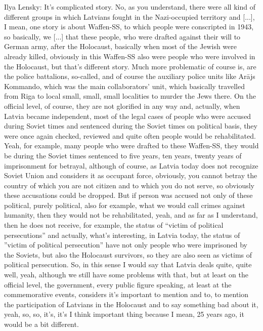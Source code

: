 Ilya Lensky: It’s complicated story. No, as you understand, there were all kind of different groups in which Latvians fought in the Nazi-occupied territory and [...], I mean, one story is about Waffen-SS, to which people were conscripted in 1943, so basically, we [...] that these people, who were drafted against their will to German army, after the Holocaust, basically when most of the Jewish were already killed, obviously in this Waffen-SS also were people who were involved in the Holocaust, but that’s different story. Much more problematic of course is, are the police battalions, so-called, and of course the auxiliary police units like Arājs Kommando, which was the main collaborators’ unit, which basically travelled from Riga to local small, small, small localities to murder the Jews there. On the official level, of course, they are not glorified in any way and, actually, when Latvia became independent, most of the legal cases of people who were accused during Soviet times and sentenced during the Soviet times on political basis, they were once again checked, reviewed and quite often people would be rehabilitated. Yeah, for example, many people who were drafted to these Waffen-SS, they would be during the Soviet times sentenced to five years, ten years, twenty years of imprisonment for betrayal, although of course, as Latvia today does not recognize Soviet Union and considers it as occupant force, obviously, you cannot betray the country of which you are not citizen and to which you do not serve, so obviously these accusations could be dropped. But if person was accused not only of these political, purely political, also for example, what we would call crimes against humanity, then they would not be rehabilitated, yeah, and as far as I understand, then he does not receive, for example, the status of “victim of political persecutions” and actually, what’s interesting, in Latvia today, the status of ”victim of political persecution” have not only people who were imprisoned by the Soviets, but also the Holocaust survivors, so they are also seen as victims of political persecution. So, in this sense I would say that Latvia deals quite, quite well, yeah, although we still have some problems with that, but at least on the official level, the government, every public figure speaking, at least at the commemorative events, considers it’s important to mention and to, to mention the participation of Latvians in the Holocaust and to say something bad about it, yeah, so, so, it’s, it’s I think important thing because I mean, 25 years ago, it would be a bit different. 

